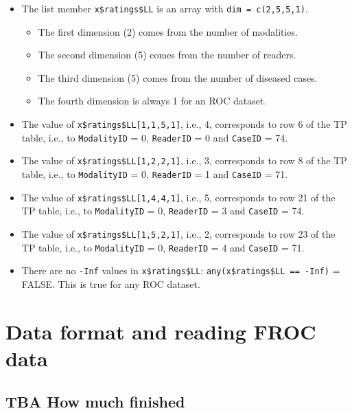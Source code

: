 \documentclass[
]{book}
\providecommand{\tightlist}{%
  \setlength{\itemsep}{0pt}\setlength{\parskip}{0pt}}
\begin{document}
\begin{itemize}
\tightlist
\item
  The list member \texttt{x\$ratings\$LL} is an array with \texttt{dim\ =\ c(2,5,5,1)}.

  \begin{itemize}
  \tightlist
  \item
    The first dimension (2) comes from the number of modalities.
  \item
    The second dimension (5) comes from the number of readers.
  \item
    The third dimension (5) comes from the number of diseased cases.
  \item
    The fourth dimension is always 1 for an ROC dataset.
  \end{itemize}
\item
  The value of \texttt{x\$ratings\$LL{[}1,1,5,1{]}}, i.e., 4, corresponds to row 6 of the TP table, i.e., to \texttt{ModalityID} = 0, \texttt{ReaderID} = 0 and \texttt{CaseID} = 74.
\item
  The value of \texttt{x\$ratings\$LL{[}1,2,2,1{]}}, i.e., 3, corresponds to row 8 of the TP table, i.e., to \texttt{ModalityID} = 0, \texttt{ReaderID} = 1 and \texttt{CaseID} = 71.
\item
  The value of \texttt{x\$ratings\$LL{[}1,4,4,1{]}}, i.e., 5, corresponds to row 21 of the TP table, i.e., to \texttt{ModalityID} = 0, \texttt{ReaderID} = 3 and \texttt{CaseID} = 74.
\item
  The value of \texttt{x\$ratings\$LL{[}1,5,2,1{]}}, i.e., 2, corresponds to row 23 of the TP table, i.e., to \texttt{ModalityID} = 0, \texttt{ReaderID} = 4 and \texttt{CaseID} = 71.
\item
  There are no \texttt{-Inf} values in \texttt{x\$ratings\$LL}: \texttt{any(x\$ratings\$LL\ ==\ -Inf)} = FALSE. This is true for any ROC dataset.
\end{itemize}

\hypertarget{quick-start-froc-data-format}{%
\chapter{Data format and reading FROC data}\label{quick-start-froc-data-format}}

\hypertarget{quick-start-froc-data-format-how-much-finished}{%
\section{TBA How much finished}\label{quick-start-froc-data-format-how-much-finished}}
\end{document}
